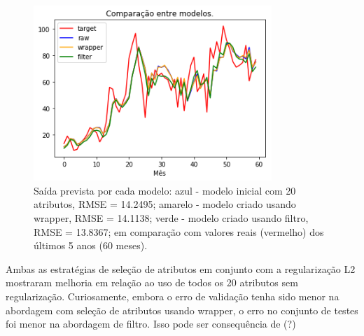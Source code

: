 \documentclass[a4paper, 12pt]{article}
\begin{document}
\begin{figure}[h!]
    \centering
  \includegraphics[width=9cm]{images/comparison.png}
    \caption{Saída prevista por cada modelo: azul - modelo inicial com 20 atributos, RMSE = 14.2495; amarelo - modelo criado usando wrapper, RMSE = 14.1138; verde - modelo criado usando filtro, RMSE = 13.8367;  em comparação com valores reais (vermelho) dos últimos 5 anos (60 meses).}
\end{figure}

Ambas as estratégias de seleção de atributos em conjunto com a regularização L2 mostraram melhoria em relação ao uso de todos os 20 atributos sem regularização. Curiosamente, embora o erro de validação tenha sido menor na abordagem com seleção de atributos usando wrapper, o erro no conjunto de testes foi menor na abordagem de filtro. Isso pode ser consequência de (?)
\end{document}
